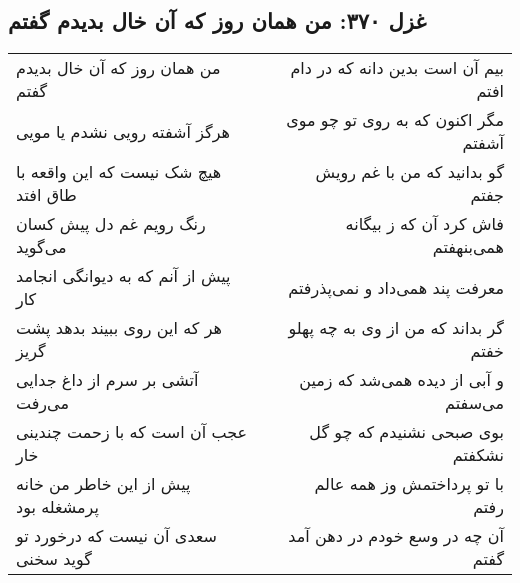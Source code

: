 \begin{center}
\section*{غزل ۳۷۰: من همان روز که آن خال بدیدم گفتم}
\label{sec:370}
\begin{longtable}{l p{0.5cm} r}
من همان روز که آن خال بدیدم گفتم
&&
بیم آن است بدین دانه که در دام افتم
\\
هرگز آشفته رویی نشدم یا مویی
&&
مگر اکنون که به روی تو چو موی آشفتم
\\
هیچ شک نیست که این واقعه با طاق افتد
&&
گو بدانید که من با غم رویش جفتم
\\
رنگ رویم غم دل پیش کسان می‌گوید
&&
فاش کرد آن که ز بیگانه همی‌بنهفتم
\\
پیش از آنم که به دیوانگی انجامد کار
&&
معرفت پند همی‌داد و نمی‌پذرفتم
\\
هر که این روی ببیند بدهد پشت گریز
&&
گر بداند که من از وی به چه پهلو خفتم
\\
آتشی بر سرم از داغ جدایی می‌رفت
&&
و آبی از دیده همی‌شد که زمین می‌سفتم
\\
عجب آن است که با زحمت چندینی خار
&&
بوی صبحی نشنیدم که چو گل نشکفتم
\\
پیش از این خاطر من خانه پرمشغله بود
&&
با تو پرداختمش وز همه عالم رفتم
\\
سعدی آن نیست که درخورد تو گوید سخنی
&&
آن چه در وسع خودم در دهن آمد گفتم
\\
\end{longtable}
\end{center}
